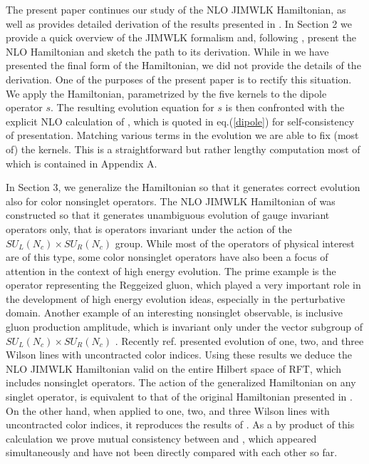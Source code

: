 \documentclass[11pt,a4paper]{article}
\begin{document}

The present paper continues our study of the NLO JIMWLK Hamiltonian, as well as provides detailed derivation of the results presented in \cite{nlojimwlk}. In Section 2 we provide a quick overview of the JIMWLK formalism and, following  
\cite{nlojimwlk}, present  the NLO Hamiltonian and sketch the path to its derivation.  While in \cite{nlojimwlk} we have presented the final form of the Hamiltonian, we did not provide the details of the derivation. One of the purposes of the present paper is to rectify this situation. We apply the Hamiltonian, parametrized by the five kernels  to the dipole operator $s$.
The resulting evolution equation
for  $s$ is then confronted with the explicit NLO calculation of \cite{BC}, which is quoted in eq.(\ref{dipole}) for self-consistency of presentation.  Matching 
various terms in the evolution we are able to fix (most of) the kernels.  This is a straightforward but
rather lengthy computation most of which is contained in  Appendix A.

In Section 3, we  generalize the Hamiltonian so that it generates correct evolution also for color nonsinglet operators. 
The NLO JIMWLK Hamiltonian of \cite{nlojimwlk} was constructed so that it generates unambiguous
 evolution of gauge invariant operators only, that is operators invariant under the action of the $SU_L(N_c)\times SU_R(N_c)$ group.  While most of the operators of physical interest are of this type, some color nonsinglet operators  have also been a focus of attention in the context of high energy evolution. The prime example is the operator representing the Reggeized gluon, which played a very important role in the development of high energy evolution ideas, especially in the perturbative domain. Another example of an interesting nonsinglet observable, is inclusive gluon production amplitude, which is invariant only under the vector subgroup of $SU_L(N_c)\times SU_R(N_c)$ \cite{tolga}.
 Recently ref. \cite{BClast} presented evolution of one, two, and three Wilson lines with uncontracted  color indices. Using these results we deduce the NLO JIMWLK Hamiltonian valid on the entire Hilbert space of RFT, which includes nonsinglet operators.
The action of the generalized Hamiltonian  on any singlet operator, 
 is equivalent to that of the original Hamiltonian presented in \cite{nlojimwlk}. On the other hand, when applied to one, two, and three
Wilson lines with uncontracted color indices, it reproduces the results of \cite{BClast}. As a by product of this calculation we prove mutual consistency between \cite{nlojimwlk} and \cite{BClast}, which appeared simultaneously and have not been directly compared with each other so far.
\end{document}
